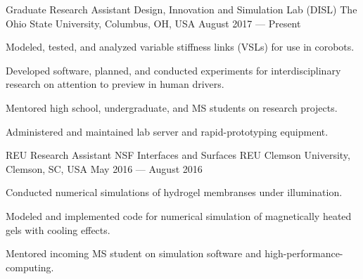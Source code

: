 

\begin{cventries}

  \cventry
    {Graduate Research Assistant} %
    {Design, Innovation and Simulation Lab (DISL)} %
    {The Ohio State University, Columbus, OH, USA} %
    {August 2017 --- Present} %
    {
      \begin{cvitems} %
        \item{Modeled, tested, and analyzed variable stiffness links (VSLs) for use in corobots.}
        \item{Developed software, planned, and conducted experiments for interdisciplinary research on attention to preview in human drivers.}
        \item{Mentored high school, undergraduate, and MS students on research projects.}
        \item{Administered and maintained lab server and rapid-prototyping equipment.}
      \end{cvitems}
    }

  \cventry
    {REU Research Assistant} %
    {NSF Interfaces and Surfaces REU} %
    {Clemson University, Clemson, SC, USA} %
    {May 2016 --- August 2016} %
    {
      \begin{cvitems} %
        \item {Conducted numerical simulations of hydrogel membranses under illumination.}
        \item {Modeled and implemented code for numerical simulation of magnetically heated gels with cooling effects.}
        \item {Mentored incoming MS student on simulation software and high-performance-computing.}
      \end{cvitems}
    }


\end{cventries}
